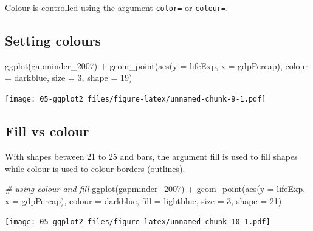 \documentclass[
]{book}
\newenvironment{Shaded}{\begin{snugshade}}{\end{snugshade}}
\newcommand{\AttributeTok}[1]{\textcolor[rgb]{0.77,0.63,0.00}{#1}}
\newcommand{\CommentTok}[1]{\textcolor[rgb]{0.56,0.35,0.01}{\textit{#1}}}
\newcommand{\DecValTok}[1]{\textcolor[rgb]{0.00,0.00,0.81}{#1}}
\newcommand{\FunctionTok}[1]{\textcolor[rgb]{0.00,0.00,0.00}{#1}}
\newcommand{\NormalTok}[1]{#1}
\newcommand{\SpecialCharTok}[1]{\textcolor[rgb]{0.00,0.00,0.00}{#1}}
\newcommand{\StringTok}[1]{\textcolor[rgb]{0.31,0.60,0.02}{#1}}
\begin{document}
Colour is controlled using the argument \texttt{color=} or \texttt{colour=}.

\hypertarget{setting-colours}{%
\subsection{Setting colours}\label{setting-colours}}

\begin{Shaded}
\begin{Highlighting}[]
\FunctionTok{ggplot}\NormalTok{(gapminder\_2007) }\SpecialCharTok{+} 
  \FunctionTok{geom\_point}\NormalTok{(}\FunctionTok{aes}\NormalTok{(}\AttributeTok{y =}\NormalTok{ lifeExp, }\AttributeTok{x =}\NormalTok{ gdpPercap), }\AttributeTok{colour =} \StringTok{\textquotesingle{}darkblue\textquotesingle{}}\NormalTok{, }\AttributeTok{size =} \DecValTok{3}\NormalTok{, }\AttributeTok{shape =} \DecValTok{19}\NormalTok{)}
\end{Highlighting}
\end{Shaded}

\texttt{[image: 05-ggplot2\_files/figure-latex/unnamed-chunk-9-1.pdf]}

\hypertarget{fill-vs-colour}{%
\subsection{Fill vs colour}\label{fill-vs-colour}}

With shapes between 21 to 25 and bars, the argument fill is used to fill shapes while colour is used to colour borders (outlines).

\begin{Shaded}
\begin{Highlighting}[]
\CommentTok{\# using colour and fill}
\FunctionTok{ggplot}\NormalTok{(gapminder\_2007) }\SpecialCharTok{+} 
\FunctionTok{geom\_point}\NormalTok{(}\FunctionTok{aes}\NormalTok{(}\AttributeTok{y =}\NormalTok{ lifeExp, }\AttributeTok{x =}\NormalTok{ gdpPercap), }\AttributeTok{colour =} \StringTok{\textquotesingle{}darkblue\textquotesingle{}}\NormalTok{, }\AttributeTok{fill =} \StringTok{\textquotesingle{}lightblue\textquotesingle{}}\NormalTok{, }
           \AttributeTok{size =} \DecValTok{3}\NormalTok{, }\AttributeTok{shape =} \DecValTok{21}\NormalTok{)}
\end{Highlighting}
\end{Shaded}

\texttt{[image: 05-ggplot2\_files/figure-latex/unnamed-chunk-10-1.pdf]}
\end{document}

